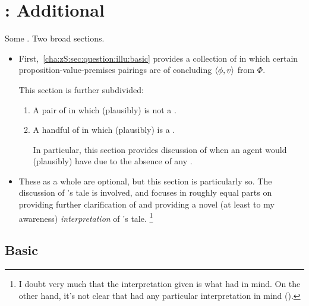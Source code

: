 \chapter{: Additional }
\label{cha:zS:sec:question:illu}

\begin{note}
  Some .
  Two broad sections.

  \begin{itemize}
  \item
    First,~\autoref{cha:zS:sec:question:illu:basic} provides a collection of  in which certain proposition-value-premises pairings are  of concluding \(\langle \phi, v \rangle\) from \(\Phi\).

    This section is further subdivided:
    \begin{enumerate}[label=]
    \item

      A pair of  in which \requ{} (plausibly) is not a \fc{}.
    \item

      A handful of  in which \requ{} (plausibly) is a \fc{}.

      In particular, this section provides discussion of when an agent would (plausibly) have \zS{} due to the absence of any .
    \end{enumerate}
  \item
    These  as a whole are optional, but this section is particularly so.
    The discussion of \citeauthor{Carroll:1895uj}'s tale is involved, and focuses in roughly equal parts on providing further clarification of \zS{} and providing a novel (at least to my awareness) \emph{interpretation} of \citeauthor{Carroll:1895uj}'s tale.%
    \footnote{
      I doubt very much that the interpretation given is what \citeauthor{Carroll:1895uj} had in mind.
      On the other hand, it's not clear that \citeauthor{Carroll:1895uj} had any particular interpretation in mind (\cite[Cf.][]{Thomson:2010tt}).
    }
  \end{itemize}
\end{note}

\section{Basic }
\label{cha:zS:sec:question:illu:basic}

